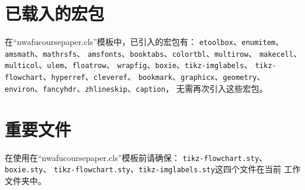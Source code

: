 \documentclass{nwafucoursepaper}
\begin{document}
\section{已载入的宏包}
在\enquote{nwafucoursepaper.cls}模板中，已引入的宏包有：
\verb|etoolbox|、\verb|enumitem|、\verb|amsmath|、\verb|mathrsfs|、
\verb|amsfonts|、\verb|booktabs|、\verb|colortbl|、\verb|multirow|、
\verb|makecell|、\verb|multicol|、\verb|ulem|、\verb|floatrow|、
\verb|wrapfig|、\verb|boxie|、\verb|tikz-imglabels|、
\verb|tikz-flowchart|、\verb|hyperref|、\verb|cleveref|、
\verb|bookmark|、\verb|graphicx|、\verb|geometry|、
\verb|environ|、\verb|fancyhdr|、\verb|zhlineskip|、\verb|caption|，
无需再次引入这些宏包。

\section{重要文件}
\begin{importantBox}
  在使用在\enquote{nwafucoursepaper.cls}模板前请确保：
  \verb|tikz-flowchart.sty|、\verb|boxie.sty|、
  \verb|tikz-flowchart.sty|、\verb|tikz-imglabels.sty|这四个文件在当前
  工作文件夹中。
\end{importantBox}
\end{document}
